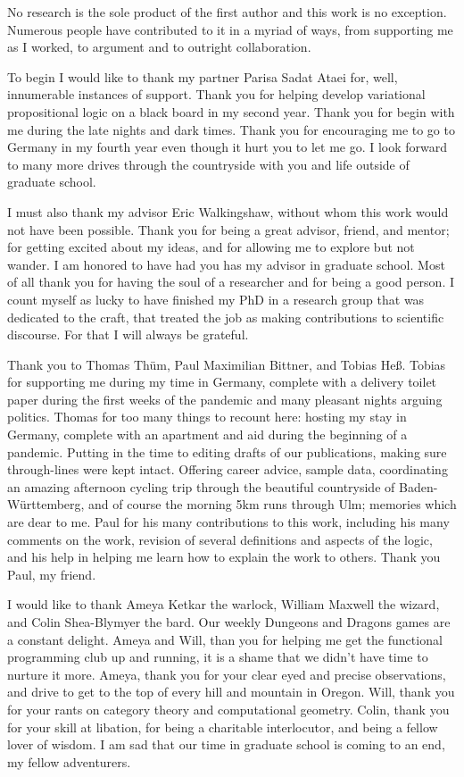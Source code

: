 No research is the sole product of the first author and this work is no
exception. Numerous people have contributed to it in a myriad of ways, from
supporting me as I worked, to argument and to outright collaboration.

To begin I would like to thank my partner Parisa Sadat Ataei for, well,
innumerable instances of support. Thank you for helping develop variational
propositional logic on a black board in my second year. Thank you for begin with
me during the late nights and dark times. Thank you for encouraging me to go to
Germany in my fourth year even though it hurt you to let me go. I look forward
to many more drives through the countryside with you and life outside of
graduate school.

I must also thank my advisor Eric Walkingshaw, without whom this work would not
have been possible. Thank you for being a great advisor, friend, and mentor; for
getting excited about my ideas, and for allowing me to explore but not wander. I
am honored to have had you has my advisor in graduate school. Most of all thank
you for having the soul of a researcher and for being a good person. I count
myself as lucky to have finished my PhD in a research group that was dedicated
to the craft, that treated the job as making contributions to scientific
discourse. For that I will always be grateful.

Thank you to Thomas Thüm, Paul Maximilian Bittner, and Tobias Heß. Tobias for
supporting me during my time in Germany, complete with a delivery toilet paper
during the first weeks of the pandemic and many pleasant nights arguing
politics. Thomas for too many things to recount here: hosting my stay in
Germany, complete with an apartment and aid during the beginning of a pandemic.
Putting in the time to editing drafts of our publications, making sure
through-lines were kept intact. Offering career advice, sample data,
coordinating an amazing afternoon cycling trip through the beautiful countryside
of Baden-Württemberg, and of course the morning 5km runs through Ulm; memories
which are dear to me. Paul for his many contributions to this work, including
his many comments on the work, revision of several definitions and aspects of
the logic, and his help in helping me learn how to explain the work to others.
Thank you Paul, my friend.

I would like to thank Ameya Ketkar the warlock, William Maxwell the wizard, and
Colin Shea-Blymyer the bard. Our weekly Dungeons and Dragons games are a
constant delight. Ameya and Will, than you for helping me get the functional
programming club up and running, it is a shame that we didn't have time to
nurture it more. Ameya, thank you for your clear eyed and precise observations,
and drive to get to the top of every hill and mountain in Oregon. Will, thank
you for your rants on category theory and computational geometry. Colin, thank
you for your skill at libation, for being a charitable interlocutor, and being a
fellow lover of wisdom. I am sad that our time in graduate school is coming to
an end, my fellow adventurers.


